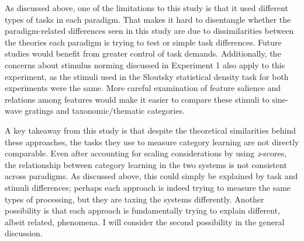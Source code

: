 \documentclass[../dissertation.tex]{subfiles}
\begin{document}
	As discussed above, one of the limitations to this study is that it used different types of tasks in each paradigm. That makes it hard to disentangle whether the paradigm-related differences seen in this study are due to dissimilarities between the theories each paradigm is trying to test or simple task differences. Future studies would benefit from greater control of task demands. Additionally, the concerns about stimulus norming discussed in Experiment 1 also apply to this experiment, as the stimuli used in the Sloutsky statistical density task for both experiments were the same. More careful examination of feature salience and relations among features would make it easier to compare these stimuli to sine-wave gratings and taxonomic/thematic categories. \par
	A key takeaway from this study is that despite the theoretical similarities behind these approaches, the tasks they use to measure category learning are not directly comparable. Even after accounting for scaling considerations by using \textit{z}-scores, the relationship between category learning in the two systems is not consistent across paradigms. As discussed above, this could simply be explained by task and stimuli differences; perhaps each approach is indeed trying to measure the same types of processing, but they are taxing the systems differently. Another possibility is that each approach is fundamentally trying to explain different, albeit related, phenomena. I will consider the second possibility in the general discussion.
\end{document}
